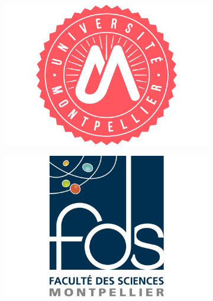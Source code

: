 \fontsize{12pt}{14pt}\selectfont
\begin{figure}[ht]
\vspace{0.3cm}
    \centering
    \begin{subfigure}[b]{0.2\textwidth}
        \includegraphics[width=\textwidth]{images/Logo_UM.png}
    \end{subfigure}
    \begin{subfigure}[b]{0.2\textwidth}
        \includegraphics[width=\textwidth]{images/Logo_FDS.png}
    \end{subfigure}
    \begin{subfigure}[b]{0.2\textwidth}

\end{subfigure}
\end{figure}
